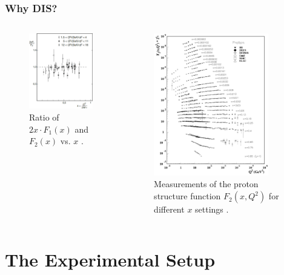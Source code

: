 \documentclass[12pt]{beamer}
\begin{document}
\begin{frame}
\frametitle{Why DIS?}
\begin{columns}[c] %
			\vspace*{-30pt}
	\begin{figure}[t]
	\centering
	\includegraphics[width=5cm]{../images/Thesis/f1_f2_spin.pdf} 
	\caption*{Ratio of $2x\cdot F_1(x)$ and $F_2(x)$ vs. $x$ \cite{PnN,IntroHEP}.}
	\label{fig:spin1/2}
\end{figure} 


\begin{figure}[t]
	\vspace*{-30pt}
	\centering
	\includegraphics[width=5cm]{../images/Thesis/SLAC_F2.png} 
	\caption*{ Measurements of the proton structure function $F_2(x, Q^2)$ for different $x$ settings\cite{ref:rev_pp} .}
	\label{F2_fig}
\end{figure} 
\end{columns}
\end{frame}

\section[Experiment]{The Experimental Setup}
\end{document}
